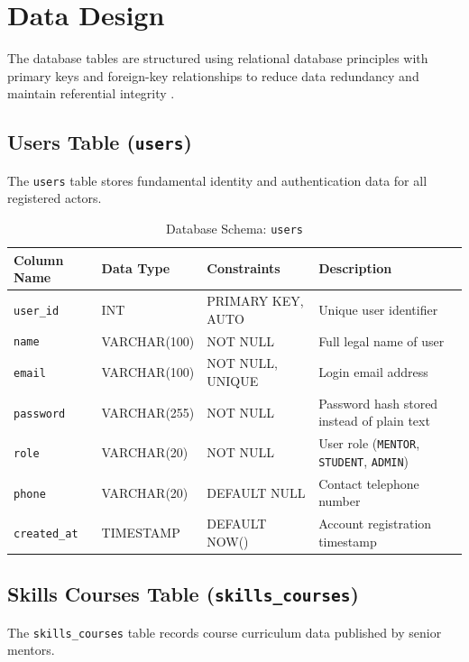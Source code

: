 \documentclass[12pt,a4paper]{report}
\begin{document}
\section{Data Design}
The database tables are structured using relational database principles with primary keys and foreign-key relationships to reduce data redundancy and maintain referential integrity \cite{silberschatz}.

\subsection{Users Table (\texttt{users})}
The \texttt{users} table stores fundamental identity and authentication data for all registered actors.

\begin{table}[H]
\centering
\small
\caption{Database Schema: \texttt{users}}
\label{tab:schema_users}
\begin{tabularx}{\textwidth}{|L{3.0cm}|L{2.8cm}|L{2.5cm}|J|}
\hline
\textbf{Column Name} & \textbf{Data Type} & \textbf{Constraints} & \textbf{Description} \\ \hline
\texttt{user\_id} & INT & PRIMARY KEY, AUTO & Unique user identifier \\ \hline
\texttt{name} & VARCHAR(100) & NOT NULL & Full legal name of user \\ \hline
\texttt{email} & VARCHAR(100) & NOT NULL, UNIQUE & Login email address \\ \hline
\texttt{password} & VARCHAR(255) & NOT NULL & Password hash stored instead of plain text \\ \hline
\texttt{role} & VARCHAR(20) & NOT NULL & User role (\texttt{MENTOR}, \texttt{STUDENT}, \texttt{ADMIN}) \\ \hline
\texttt{phone} & VARCHAR(20) & DEFAULT NULL & Contact telephone number \\ \hline
\texttt{created\_at} & TIMESTAMP & DEFAULT NOW() & Account registration timestamp \\ \hline
\end{tabularx}
\end{table}

\subsection{Skills Courses Table (\texttt{skills\_courses})}
The \texttt{skills\_courses} table records course curriculum data published by senior mentors.
\end{document}
